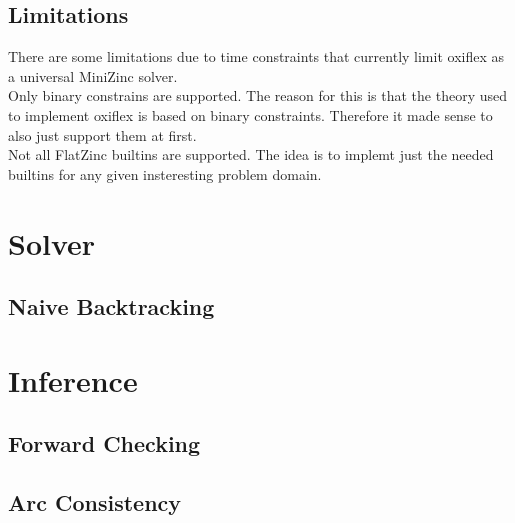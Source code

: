 

\subsection{Limitations}

There are some limitations due to time constraints that currently limit oxiflex as a universal MiniZinc solver. \\

Only binary constrains are supported. The reason for this is that the theory used to implement oxiflex is based on binary constraints. Therefore it made sense to also just support them at first. \\

Not all FlatZinc builtins are supported. The idea is to implemt just the needed builtins for any given insteresting problem domain.

\section{Solver}

\subsection{Naive Backtracking}

\section{Inference} \label{inference}

\subsection{Forward Checking}

\subsection{Arc Consistency}


